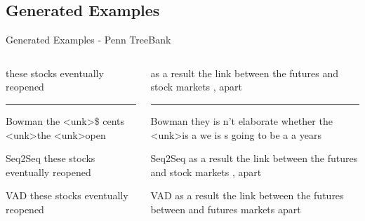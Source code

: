 \documentclass[aspectratio=169, 11pt]{beamer}
\begin{document}
\subsection{Generated Examples}
\begin{frame}{Generated Examples - Penn TreeBank}
  \small
  \begin{columns}
    \begin{column}{0.5\textwidth}

        these stocks eventually reopened 

      \noindent\rule{\textwidth}{0.4pt}
      \begin{block}{Bowman}
        the  \textless{}unk\textgreater\space \$ cents \textless{}unk\textgreater\space the \textless{}unk\textgreater\space  open      
      \end{block}
      \begin{block}{Seq2Seq}
        these stocks eventually reopened 
      \end{block}
      \begin{block}{VAD}
        these stocks eventually reopened 
      \end{block}
    \end{column}
    \begin{column}{0.5\textwidth}
     
        as a result the link between the futures and stock markets , apart   
  
      \noindent\rule{\textwidth}{0.4pt}
      \begin{block}{Bowman}
        they is n't elaborate whether the \textless{}unk\textgreater\space  is a we is s going to be a a years
      \end{block}
      \begin{block}{Seq2Seq}
        as a result the link between the futures and stock markets , apart 
      \end{block}
      \begin{block}{VAD}
        as a result the link between the futures between and futures markets apart
      \end{block}
    \end{column}
  \end{columns}
\end{frame}
\end{document}
